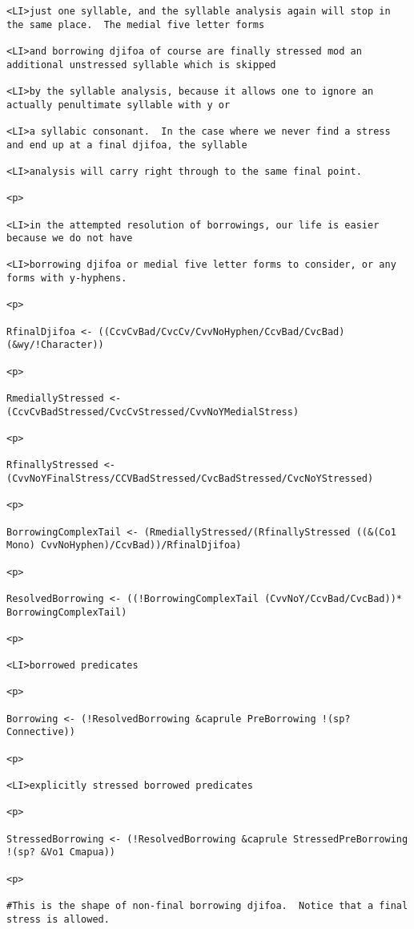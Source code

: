 \documentclass[12pt]{article}
\begin{document}
\begin{lstlisting}
<LI>just one syllable, and the syllable analysis again will stop in the same place.  The medial five letter forms

<LI>and borrowing djifoa of course are finally stressed mod an additional unstressed syllable which is skipped

<LI>by the syllable analysis, because it allows one to ignore an actually penultimate syllable with y or

<LI>a syllabic consonant.  In the case where we never find a stress and end up at a final djifoa, the syllable

<LI>analysis will carry right through to the same final point.

<p>

<LI>in the attempted resolution of borrowings, our life is easier because we do not have

<LI>borrowing djifoa or medial five letter forms to consider, or any forms with y-hyphens.

<p>

RfinalDjifoa <- ((CcvCvBad/CvcCv/CvvNoHyphen/CcvBad/CvcBad) (&wy/!Character))

<p>

RmediallyStressed <- (CcvCvBadStressed/CvcCvStressed/CvvNoYMedialStress)

<p>

RfinallyStressed <- (CvvNoYFinalStress/CCVBadStressed/CvcBadStressed/CvcNoYStressed)

<p>

BorrowingComplexTail <- (RmediallyStressed/(RfinallyStressed ((&(Co1 Mono) CvvNoHyphen)/CcvBad))/RfinalDjifoa)

<p>

ResolvedBorrowing <- ((!BorrowingComplexTail (CvvNoY/CcvBad/CvcBad))* BorrowingComplexTail)

<p>

<LI>borrowed predicates

<p>

Borrowing <- (!ResolvedBorrowing &caprule PreBorrowing !(sp? Connective))

<p>

<LI>explicitly stressed borrowed predicates

<p>

StressedBorrowing <- (!ResolvedBorrowing &caprule StressedPreBorrowing !(sp? &Vo1 Cmapua))

<p>

#This is the shape of non-final borrowing djifoa.  Notice that a final stress is allowed.


\end{lstlisting}
\end{document}
